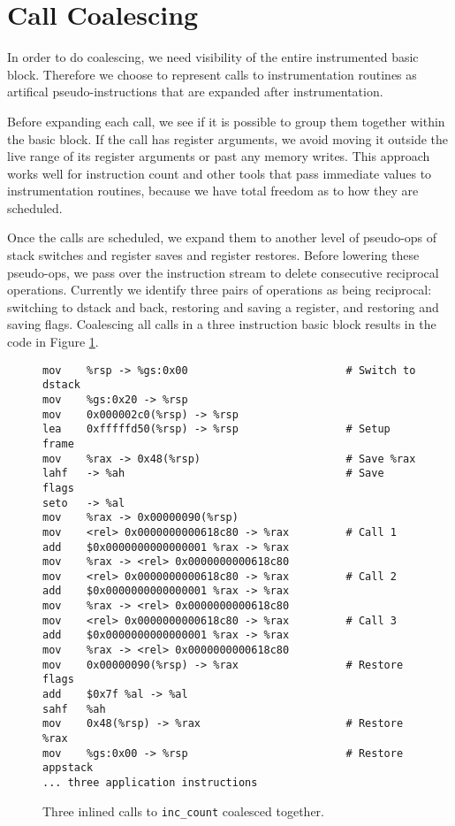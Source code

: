 \section{Call Coalescing}

In order to do coalescing, we need visibility of the entire instrumented basic
block.  Therefore we choose to represent calls to instrumentation routines as
artifical pseudo-instructions that are expanded after instrumentation.

Before expanding each call, we see if it is possible to group them together
within the basic block.  If the call has register arguments, we avoid moving it
outside the live range of its register arguments or past any memory writes.
This approach works well for instruction count and other tools that pass
immediate values to instrumentation routines, because we have total freedom as
to how they are scheduled.

Once the calls are scheduled, we expand them to another level of pseudo-ops of
stack switches and register saves and register restores.  Before lowering these
pseudo-ops, we pass over the instruction stream to delete consecutive
reciprocal operations.  Currently we identify three pairs of operations as
being reciprocal: switching to dstack and back, restoring and saving a
register, and restoring and saving flags.  Coalescing all calls in a three
instruction basic block results in the code in Figure
\ref{fig:inscount_coalesced}.

\begin{figure}
\begin{verbatim}
mov    %rsp -> %gs:0x00                         # Switch to dstack
mov    %gs:0x20 -> %rsp 
mov    0x000002c0(%rsp) -> %rsp 
lea    0xfffffd50(%rsp) -> %rsp                 # Setup frame
mov    %rax -> 0x48(%rsp)                       # Save %rax
lahf   -> %ah                                   # Save flags
seto   -> %al 
mov    %rax -> 0x00000090(%rsp) 
mov    <rel> 0x0000000000618c80 -> %rax         # Call 1
add    $0x0000000000000001 %rax -> %rax 
mov    %rax -> <rel> 0x0000000000618c80 
mov    <rel> 0x0000000000618c80 -> %rax         # Call 2
add    $0x0000000000000001 %rax -> %rax 
mov    %rax -> <rel> 0x0000000000618c80 
mov    <rel> 0x0000000000618c80 -> %rax         # Call 3
add    $0x0000000000000001 %rax -> %rax 
mov    %rax -> <rel> 0x0000000000618c80 
mov    0x00000090(%rsp) -> %rax                 # Restore flags
add    $0x7f %al -> %al 
sahf   %ah 
mov    0x48(%rsp) -> %rax                       # Restore %rax
mov    %gs:0x00 -> %rsp                         # Restore appstack
... three application instructions
\end{verbatim}
\caption{Three inlined calls to {\tt inc\_count} coalesced together.}
\label{fig:inscount_coalesced}
\end{figure}

